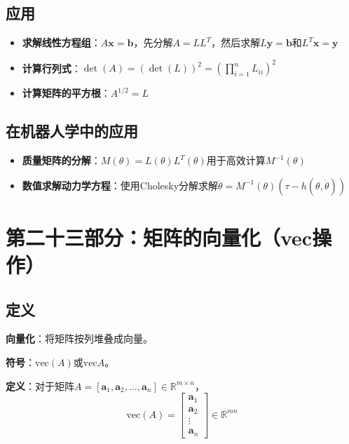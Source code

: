 \documentclass[12pt,a4paper]{article}
\begin{document}
\subsection{应用}

\begin{itemize}
\item \textbf{求解线性方程组}：$A\bm{x} = \bm{b}$，先分解$A = LL^T$，然后求解$L\bm{y} = \bm{b}$和$L^T\bm{x} = \bm{y}$
\item \textbf{计算行列式}：$\det(A) = (\det(L))^2 = (\prod_{i=1}^n L_{ii})^2$
\item \textbf{计算矩阵的平方根}：$A^{1/2} = L$
\end{itemize}

\subsection{在机器人学中的应用}

\begin{itemize}
\item \textbf{质量矩阵的分解}：$M(\theta) = L(\theta) L^T(\theta)$用于高效计算$M^{-1}(\theta)$
\item \textbf{数值求解动力学方程}：使用Cholesky分解求解$\ddot{\theta} = M^{-1}(\theta)(\tau - h(\theta, \dot{\theta}))$
\end{itemize}

\section{第二十三部分：矩阵的向量化（vec操作）}

\subsection{定义}

\textbf{向量化}：将矩阵按列堆叠成向量。

\textbf{符号}：$\text{vec}(A)$或$\text{vec} A$。

\textbf{定义}：对于矩阵$A = [\bm{a}_1, \bm{a}_2, \ldots, \bm{a}_n] \in \mathbb{R}^{m \times n}$，
\begin{equation}
\text{vec}(A) = \begin{bmatrix} \bm{a}_1 \\ \bm{a}_2 \\ \vdots \\ \bm{a}_n \end{bmatrix} \in \mathbb{R}^{mn}
\end{equation}
\end{document}
